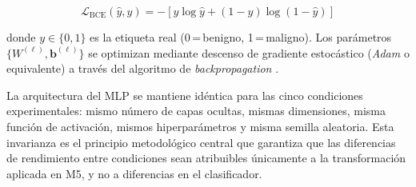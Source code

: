 \begin{equation}
  \mathcal{L}_{\text{BCE}}(\hat{y}, y) =
  -\left[y\log\hat{y} + (1-y)\log(1-\hat{y})\right]
  \label{eq:bce_loss}
\end{equation}

\noindent donde $y \in \{0, 1\}$ es la etiqueta real
(0\,=\,benigno, 1\,=\,maligno). Los parámetros
$\{W^{(\ell)}, \mathbf{b}^{(\ell)}\}$ se optimizan
mediante descenso de gradiente estocástico (\textit{Adam}
o equivalente) a través del algoritmo de
\textit{backpropagation} \cite{goodfellow2016deep}.

La arquitectura del MLP se mantiene idéntica para las cinco
condiciones experimentales: mismo número de capas ocultas,
mismas dimensiones, misma función de activación, mismos
hiperparámetros y misma semilla aleatoria. Esta
invarianza es el principio metodológico central que garantiza
que las diferencias de rendimiento entre condiciones sean
atribuibles únicamente a la transformación aplicada en M5,
y no a diferencias en el clasificador.
